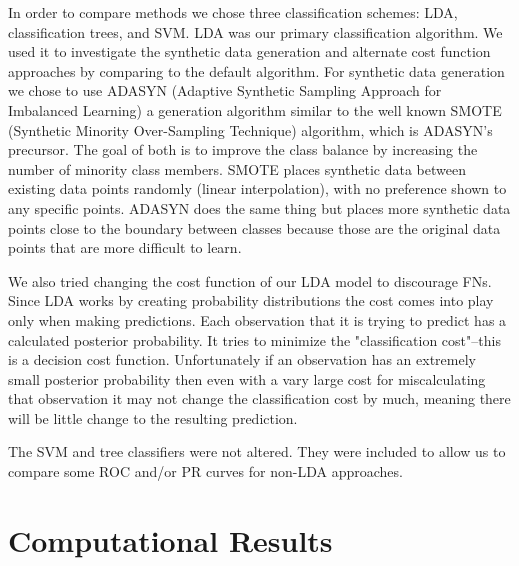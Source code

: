 \documentclass{article}
\begin{document}
In order to compare methods we chose three classification schemes: LDA, classification trees, and SVM. LDA was our primary classification algorithm. We used it to investigate the synthetic data generation and alternate cost function approaches by comparing to the default algorithm.
For synthetic data generation we chose to use ADASYN (Adaptive Synthetic Sampling Approach for Imbalanced Learning) a generation algorithm similar to the well known SMOTE (Synthetic Minority Over-Sampling Technique) algorithm, which is ADASYN's precursor.
The goal of both is to improve the class balance by increasing the number of minority class members.
SMOTE places synthetic data between existing data points randomly (linear interpolation), with no preference shown to any specific points.
ADASYN does the same thing but places more synthetic data points close to the boundary between classes because those are the original data points that are more difficult to learn.

We also tried changing the cost function of our LDA model to discourage FNs.
Since LDA works by creating probability distributions the cost comes into play only when making predictions.
Each observation that it is trying to predict has a calculated posterior probability.
It tries to minimize the "classification cost"--this is a decision cost function.
Unfortunately if an observation has an extremely small posterior probability then even with a vary large cost for miscalculating that observation it may not change the classification cost by much, meaning there will be little change to the resulting prediction.

The SVM and tree classifiers were not altered. They were included to allow us to compare some ROC and/or PR curves for non-LDA approaches.

\section{Computational Results}

%
%
\end{document}
